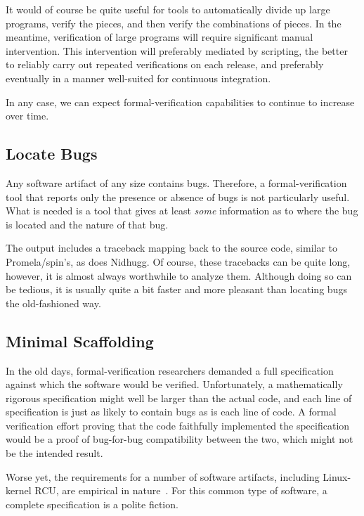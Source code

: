 It would of course be quite useful for tools to automatically divide
up large programs, verify the pieces, and then verify the combinations
of pieces.
In the meantime, verification of large programs will require significant
manual intervention.
This intervention will preferably mediated by scripting, the better to
reliably carry out repeated verifications on each release, and
preferably eventually in a manner well-suited for continuous integration.

In any case, we can expect formal-verification capabilities to continue
to increase over time.

\subsection{Locate Bugs}
\label{sec:formal:Locate Bugs}

Any software artifact of any size contains bugs.
Therefore, a formal-verification tool that reports only the
presence or absence of bugs is not particularly useful.
What is needed is a tool that gives at least \emph{some} information
as to where the bug is located and the nature of that bug.

The  output includes a traceback mapping back to the source
code, similar to Promela/spin's, as does Nidhugg.
Of course, these tracebacks can be quite long, however, it is almost
always worthwhile to analyze them.
Although doing so can be tedious, it is usually quite a bit faster
and more pleasant than locating bugs the old-fashioned way.

\subsection{Minimal Scaffolding}
\label{sec:formal:Minimal Scaffolding}

In the old days, formal-verification researchers demanded a full
specification against which the software would be verified.
Unfortunately, a mathematically rigorous specification might well
be larger than the actual code, and each line of specification
is just as likely to contain bugs as is each line of code.
A formal verification effort proving that the code faithfully
implemented the specification would be a proof of bug-for-bug
compatibility between the two, which might not be the intended
result.

Worse yet, the requirements for a number of software artifacts,
including Linux-kernel RCU, are empirical in
nature~\cite{PaulEMcKenney2015RCUreqts1,PaulEMcKenney2015RCUreqts2,PaulEMcKenney2015RCUreqts3}.
For this common type of software, a complete specification is a
polite fiction.

